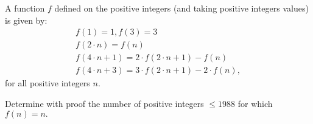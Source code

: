 A function $ f$ defined on the positive integers (and taking positive integers values) is given by:
$$ \begin{matrix} f(1) = 1, f(3) = 3 \\

f(2 \cdot n) = f(n) \\

f(4 \cdot n + 1) = 2 \cdot f(2 \cdot n + 1) - f(n) \\

f(4 \cdot n + 3) = 3 \cdot f(2 \cdot n + 1) - 2 \cdot f(n), \end{matrix}$$
for all positive integers $ n.$

Determine with proof the number of positive integers $ \leq 1988$ for which $ f(n) = n.$
